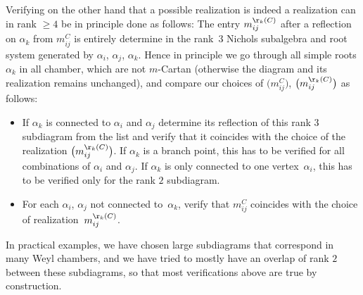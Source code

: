 \documentclass[10pt,a4paper]{amsart}
\numberwithin{equation}{section}
\begin{document}
Verifying on the other hand that a possible realization is indeed a realization can in rank $\geq 4$ be in principle done as follows: The entry $m_{ij}^{\r_k(C)}$ after a reflection on $\alpha_k$ from $m_{ij}^C$ is entirely determine in the rank~$3$ Nichols subalgebra and root system generated by $\alpha_i$, $\alpha_j$, $\alpha_k$. Hence in principle we go through all simple roots $\alpha_k$ in all chamber, which are not $m$-Cartan (otherwise the diagram and its realization remains unchanged), and compare our choices of $\big(m_{ij}^{C}\big)$, $\big(m_{ij}^{\r_k(C)}\big)$ as follows:
\begin{itemize}\itemsep=0pt
	\item If $\alpha_k$ is connected to $\alpha_i$ and $\alpha_j$ determine its reflection of this rank $3$ subdiagram from the list and verify that it coincides with the choice of the realization $\big(m_{ij}^{\r_k(C)}\big)$. If $\alpha_k$ is a branch point, this has to be verified for all combinations of $\alpha_i$ and $\alpha_j$. If $\alpha_k$ is only connected to one vertex~$\alpha_i$, this has to be verified only for the rank $2$ subdiagram.
	\item For each $\alpha_i$, $\alpha_j$ not connected to~$\alpha_k$, verify that $m_{ij}^{C}$ coincides with the choice of realization~$m_{ij}^{\r_k(C)}$.
\end{itemize}
In practical examples, we have chosen large subdiagrams that correspond in many Weyl chambers, and we have tried to mostly have an overlap of rank $2$ between these subdiagrams, so that most verifications above are true by construction.
\end{document}
